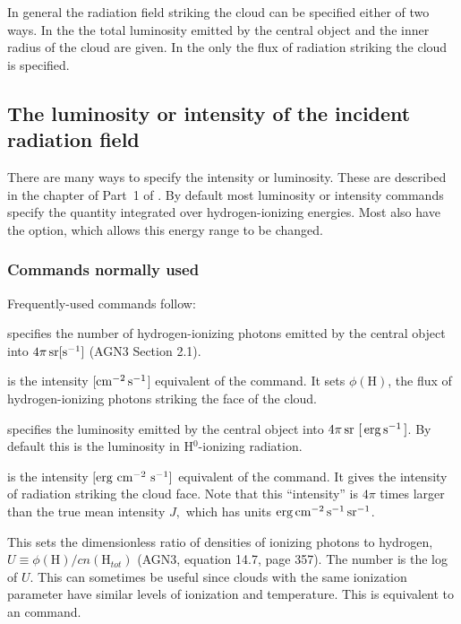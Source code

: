 \documentclass[12pt,twoside]{article}
\begin{document}
{In general the radiation field striking the cloud can be specified either
of two ways.
In the 
the total luminosity emitted by the
central object and the inner radius of the
cloud are given.
In the  only the flux of radiation striking
the cloud is specified.

\subsection{The luminosity or intensity of the incident radiation field}

There are many ways to specify the intensity or luminosity.
These are described
in the chapter  of Part~1 of \Hazy.
By default most
luminosity or intensity commands specify the quantity integrated over
hydrogen-ionizing energies.  Most also have
the  option, which allows
this energy range to be changed.

\subsubsection{Commands normally used}

Frequently-used commands follow:

 specifies the number of
hydrogen-ionizing photons emitted by the
central object into $4\pi\,\rm{sr} \rm{[s^{-1}]}$ (AGN3 Section 2.1).

 is the intensity
[$\rm{cm^{-2}\, s^{-1}}$] equivalent of the  command.
It sets $\phi(\mathrm{H})$,
the flux of hydrogen-ionizing photons striking the face of the cloud.

 specifies the luminosity
emitted by the central object into
$4\pi {\rm\thinspace sr}\ [\mbox{${\rm\thinspace erg}{\rm\thinspace s}^{-1}\,$} ]$.  By default this
is the luminosity in H$^0$-ionizing radiation.

 is the intensity
$[\rm{erg} \ \rm{cm}^{-2} \ \rm{s}^{-1}]$
equivalent of the 
command.  It gives the intensity of radiation striking the cloud face.
Note that this ``intensity'' is $4\pi$ times
larger than the true mean intensity
$J,$ which has units $\rm{erg\, cm^{-2}\, s^{-1}\, sr^{-1}}$.

\quad  This
sets the dimensionless ratio of densities
of ionizing photons to hydrogen, $U\equiv
\phi(\mathrm{H})/cn(\mathrm{H}_\mathit{tot})$
(AGN3, equation 14.7, page 357).  The number is the log of $U$.  This
can sometimes be useful since clouds with the same ionization parameter
have similar levels of ionization and temperature.  This is equivalent to
an  command.

}
\end{document}
